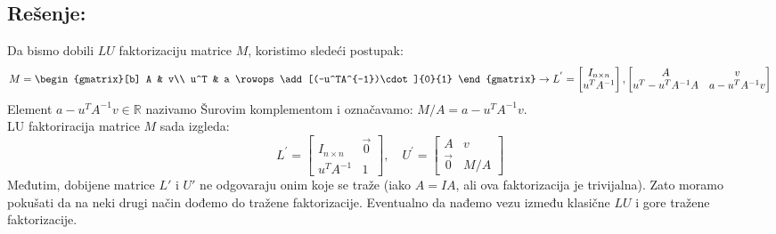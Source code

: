 \documentclass[11pt]{article}
\begin{document}
\subsection*{Rešenje:}
Da bismo dobili $LU$ faktorizaciju matrice $M$, koristimo sledeći postupak:
\begin{equation*}
M=
\begin{gmatrix}[b]
A & v\\
u^T & a
\rowops
\add[(-u^TA^{-1})\cdot]{0}{1}
\end{gmatrix}
\to
L^{'}=
\begin{bmatrix}
I_{n\times n}\\ u^TA^{-1}
\end{bmatrix},
\begin{bmatrix}
A & v \\ u^T-u^TA^{-1}A & a-u^TA^{-1}v
\end{bmatrix}
\end{equation*}
Element $a-u^TA^{-1}v \in \mathbb{R}$ nazivamo Šurovim komplementom i označavamo: $M/A=a-u^TA^{-1}v$.\\
LU faktoriracija matrice $M$ sada izgleda:
\begin{equation*}\tag{2}\label{eq2}
L^{'}=
\begin{bmatrix}
I_{n \times n} & \overrightarrow{0} \\ u^TA^{-1} & 1
\end{bmatrix},
\quad
U^{'}=
\begin{bmatrix}
A & v \\ \overrightarrow{0} & M/A
\end{bmatrix}
\end{equation*}
Međutim, dobijene matrice $L'$ i $U'$ ne odgovaraju onim koje se traže (iako $A=IA$, ali ova faktorizacija je trivijalna). Zato moramo pokušati da na neki drugi način dođemo do tražene faktorizacije. Eventualno da nađemo vezu između klasične $LU$ i gore tražene faktorizacije.
\end{document}
